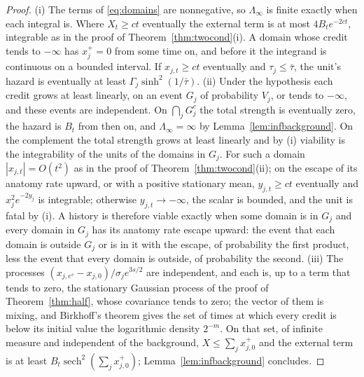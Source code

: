 \begin{proof}
(i) The terms of \eqref{eq:domains} are nonnegative, so $\Lambda_\infty$
is finite exactly when each integral is. Where $X_t\ge ct$ eventually the
external term is at most $4B_te^{-2ct}$, integrable as in the proof of
Theorem~\ref{thm:twocond}(i). A domain whose credit tends to $-\infty$ has
$x_j^+=0$ from some time on, and before it the integrand is continuous on
a bounded interval. If $x_{j,t}\ge ct$ eventually and
$\tau_j\le\bar\tau$, the unit's hazard is eventually at least
$\Gamma_j\sinh^2(1/\bar\tau)$. (ii) Under the hypothesis each credit grows
at least linearly, on an event $G_j$ of probability $V_j$, or tends to
$-\infty$, and these events are independent. On $\bigcap_jG_j^c$ the total
strength is eventually zero, the hazard is $B_t$ from then on, and
$\Lambda_\infty=\infty$ by Lemma~\ref{lem:infbackground}. On the
complement the total strength grows at least linearly and by (i)
viability is the integrability of the units of the domains in $G_j$. For
such a domain $|x_{j,t}|=O(t^2)$ as in the proof of
Theorem~\ref{thm:twocond}(ii); on the escape of its anatomy rate upward,
or with a positive stationary mean, $y_{j,t}\ge ct$ eventually and
$x_j^2e^{-2y_j}$ is integrable; otherwise $y_{j,t}\to-\infty$, the scalar
is bounded, and the unit is fatal by (i). A history is therefore viable
exactly when some domain is in $G_j$ and every domain in $G_j$ has its
anatomy rate escape upward: the event that each domain is outside $G_j$
or is in it with the escape, of probability the first product, less the
event that every domain is outside, of probability the second. (iii) The
processes $(x_{j,e^s}-x_{j,0})/\sigma_je^{3s/2}$ are independent, and each
is, up to a term that tends to zero, the stationary Gaussian process of
the proof of Theorem~\ref{thm:half}, whose covariance tends to zero; the
vector of them is mixing, and Birkhoff's theorem gives the set of times
at which every credit is below its initial value the logarithmic density
$2^{-m}$. On that set, of infinite measure and independent of the
background, $X\le\sum_jx_{j,0}^+$ and the external term is at least
$B_t\operatorname{sech}^2(\sum_jx_{j,0}^+)$;
Lemma~\ref{lem:infbackground} concludes.
\end{proof}

